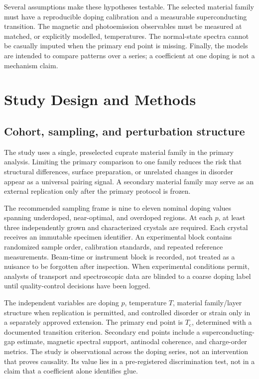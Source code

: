 \documentclass[conference]{IEEEtran}
\newcommand{\Tc}{\ensuremath{T_{\mathrm{c}}}}
\begin{document}
Several assumptions make these hypotheses testable. The selected material family must have a reproducible doping calibration and a measurable superconducting transition. The magnetic and photoemission observables must be measured at matched, or explicitly modelled, temperatures. The normal-state spectra cannot be casually imputed when the primary end point is missing. Finally, the models are intended to compare patterns over a series; a coefficient at one doping is not a mechanism claim.

\section{Study Design and Methods}

\subsection{Cohort, sampling, and perturbation structure}

The study uses a single, preselected cuprate material family in the primary analysis. Limiting the primary comparison to one family reduces the risk that structural differences, surface preparation, or unrelated changes in disorder appear as a universal pairing signal. A secondary material family may serve as an external replication only after the primary protocol is frozen.

The recommended sampling frame is nine to eleven nominal doping values spanning underdoped, near-optimal, and overdoped regions. At each $p$, at least three independently grown and characterized crystals are required. Each crystal receives an immutable specimen identifier. An experimental block contains randomized sample order, calibration standards, and repeated reference measurements. Beam-time or instrument block is recorded, not treated as a nuisance to be forgotten after inspection. When experimental conditions permit, analysts of transport and spectroscopic data are blinded to a coarse doping label until quality-control decisions have been logged.

The independent variables are doping $p$, temperature $T$, material family/layer structure when replication is permitted, and controlled disorder or strain only in a separately approved extension. The primary end point is \Tc, determined with a documented transition criterion. Secondary end points include a superconducting-gap estimate, magnetic spectral support, antinodal coherence, and charge-order metrics. The study is observational across the doping series, not an intervention that proves causality. Its value lies in a pre-registered discrimination test, not in a claim that a coefficient alone identifies glue.
\end{document}
